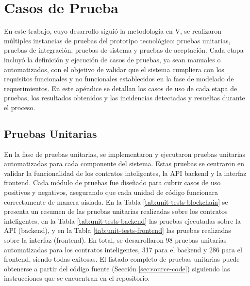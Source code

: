 \chapter{Casos de Prueba}
\label{cp:tests-execution-results}

En este trabajo, cuyo desarrollo siguió la metodología en V, se realizaron múltiples instancias de pruebas del prototipo tecnológico: pruebas unitarias, pruebas de integración, pruebas de sistema y pruebas de aceptación. Cada etapa incluyó la definición y ejecución de casos de pruebas, ya sean manuales o automatizados, con el objetivo de validar que el sistema cumpliera con los requisitos funcionales y no funcionales establecidos en la fase de modelado de requerimientos. En este apéndice se detallan los casos de uso de cada etapa de pruebas, los resultados obtenidos y las incidencias detectadas y resueltas durante el proceso.

\section{Pruebas Unitarias}
\label{sec:unit-testing-details}

En la fase de pruebas unitarias, se implementaron y ejecutaron pruebas unitarias automatizadas para cada componente del sistema. Estas pruebas se centraron en validar la funcionalidad de los contratos inteligentes, la API backend y la interfaz frontend. Cada módulo de pruebas fue diseñado para cubrir casos de uso positivos y negativos, asegurando que cada unidad de código funcionara correctamente de manera aislada. En la Tabla \ref{tab:unit-tests-blockchain} se presenta un resumen de las pruebas unitarias realizadas sobre los contratos inteligentes, en la Tabla \ref{tab:unit-tests-backend} las pruebas ejecutadas sobre la API (backend), y en la Tabla \ref{tab:unit-tests-frontend} las pruebas realizadas sobre la interfaz (frontend). En total, se desarrollaron 98 pruebas unitarias automatizadas para los contratos inteligentes, 317 para el backend y 286 para el frontend, siendo todas exitosas. El listado completo de pruebas unitarias puede obtenerse a partir del código fuente (Sección \ref{sec:source-code}) siguiendo las instrucciones que se encuentran en el repositorio.


